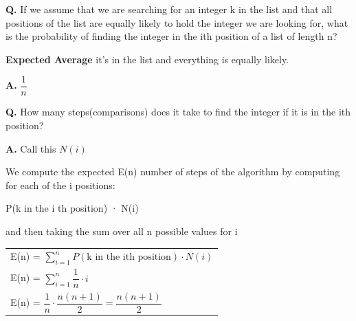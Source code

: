 \documentclass{article}
\begin{document}
\vspace{0.3cm}

\textbf{Q.} If we assume that we are searching for an integer k in the list and that all positions of the list are equally likely to hold the integer we are looking for, what is the probability of finding the integer in the ith position of a list of length n?

\textbf{Expected Average} it's in the list and everything is equally likely.

\textbf{A.} $\dfrac{1}{n}$

\vspace{0.3cm}

\textbf{Q.} How many steps(comparisons) does it take to find the integer if it is in the
ith position?

\textbf{A.} Call this $N(i)$

We compute the expected E(n) number of steps of the algorithm
by computing for each of the i positions:

\centerline{P(k in the i
th position) · N(i)}

and then taking the sum over all n possible values for i

\begin{tabular}{l}
  E(n) = $\displaystyle \sum_{i = 1}^{n} P(\text{k in the ith position}) \cdot N(i)$\\
 E(n) = $\displaystyle \sum_{i = 1}^{n} \dfrac{1}{n} \cdot i$\\
E(n) = $\displaystyle \dfrac{1}{n} \cdot \dfrac{n(n+1)}{2} = \dfrac{n(n + 1)}{2}$
\end{tabular}
\end{document}
